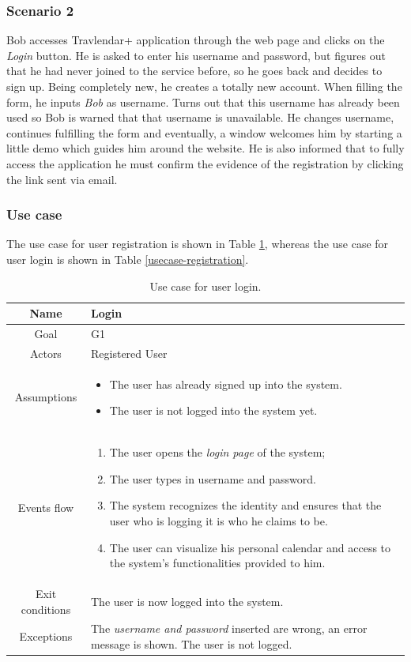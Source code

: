\subsubsection{Scenario 2}
Bob accesses Travlendar+ application through the web page and clicks on the \textit{Login} button. He is asked to enter his username and password, but figures out that he had never joined to the service before, so he goes back and decides to sign up. Being completely new, he creates a totally new account. When filling the form, he inputs \textit{Bob} as username. Turns out that this username has already been used so Bob is warned that that username is unavailable. He changes username, continues fulfilling the form and eventually, a window welcomes him by starting a little demo which guides him around the website. He is also informed that to fully access the application he must confirm the evidence of the registration by clicking the link sent via email.

\subsubsection{Use case}
The use case for user registration is shown in Table \ref{usecase-login}, whereas the use case for user login is shown in Table \ref{usecase-registration}.
\begin{table}
\centering
\begin{tabular}{|c||p{}|}
	\hline
    Name & Login \\ \hline
    Goal & G1 \\ \hline
    Actors & Registered User \\ \hline
    Assumptions & \begin{itemize}
    					\item The user has already signed up into the system. 
                        \item The user is not logged into the system yet.
                  \end{itemize} \\ \hline
    Events flow & \begin{enumerate}
                   		\item The user opens the \textit{login page} of the system;
                        \item The user types in username and password.
                        \item The system recognizes the identity and ensures that the user who is logging it is who he claims to be.
                        \item The user can visualize his personal calendar and access to the system's functionalities provided to him.
                     \end{enumerate} \\ \hline
   Exit conditions & The user is now logged into the system. \\ \hline
   Exceptions & The \textit{username and password} inserted are wrong, an error message is shown. The user is not logged.\\ \hline
\end{tabular}
\caption{Use case for user login.}
\label{usecase-login}
\end{table}

